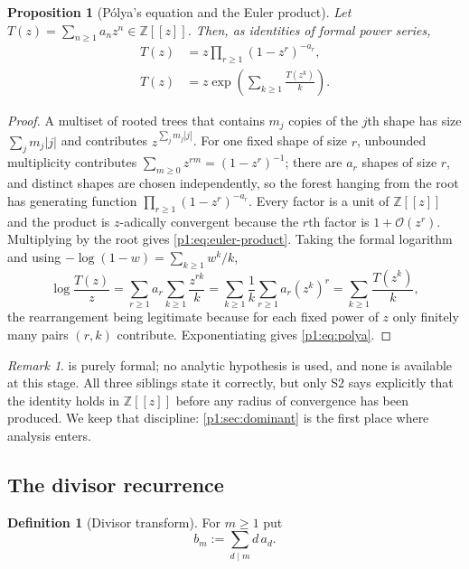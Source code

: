 \documentclass[11pt,a4paper,oneside]{book}
\theoremstyle{plain}
\newtheorem{proposition}[theorem]{Proposition}
\theoremstyle{definition}
\newtheorem{definition}[theorem]{Definition}
\theoremstyle{remark}
\newtheorem{remark}[theorem]{Remark}
\newcommand{\Int}{\mathbb{Z}}
\newcommand{\bigO}{\mathcal{O}}
\begin{document}
\begin{proposition}[P\'olya's equation and the Euler product]
\label{p1:prop:polya}
Let $T(z)=\sum_{n\ge1}a_nz^n\in\Int[[z]]$.  Then, as identities of formal power series,
\begin{align}
 T(z)&=z\prod_{r\ge1}(1-z^r)^{-a_r},
 \label{p1:eq:euler-product}\\
 T(z)&=z\exp\!\left(\sum_{k\ge1}\frac{T(z^k)}{k}\right).
 \label{p1:eq:polya}
\end{align}
\end{proposition}

\begin{proof}
A multiset of rooted trees that contains $m_j$ copies of the $j$th shape has size
$\sum_jm_j|j|$ and contributes $z^{\sum_jm_j|j|}$.  For one fixed shape of size $r$, unbounded
multiplicity contributes $\sum_{m\ge0}z^{rm}=(1-z^r)^{-1}$; there are $a_r$ shapes of size
$r$, and distinct shapes are chosen independently, so the forest hanging from the root has
generating function $\prod_{r\ge1}(1-z^r)^{-a_r}$.  Every factor is a unit of $\Int[[z]]$ and
the product is $z$-adically convergent because the $r$th factor is $1+\bigO(z^r)$. Multiplying
by the root gives \cref{p1:eq:euler-product}.  Taking the formal logarithm and using
$-\log(1-w)=\sum_{k\ge1}w^k/k$,
\[
\log\frac{T(z)}{z} =\sum_{r\ge1}a_r\sum_{k\ge1}\frac{z^{rk}}{k}
=\sum_{k\ge1}\frac1k\sum_{r\ge1}a_r(z^k)^r =\sum_{k\ge1}\frac{T(z^k)}{k},
\]
the rearrangement being legitimate because for each fixed power of $z$ only finitely many
pairs $(r,k)$ contribute.  Exponentiating gives \cref{p1:eq:polya}.
\end{proof}

\begin{remark}
 is purely formal; no analytic hypothesis is used, and none is available at
this stage.  All three siblings state it correctly, but only \textsf{S2} says explicitly that
the identity holds in $\Int[[z]]$ before any radius of convergence has been produced.  We keep
that discipline: \cref{p1:sec:dominant} is the first place where analysis enters.
\end{remark}

\subsection{The divisor recurrence}

\begin{definition}[Divisor transform]
\label{p1:def:divisor}
For $m\ge1$ put
\begin{equation}
 b_m:=\sum_{d\mid m}d\,a_d .
 \label{p1:eq:divisor}
\end{equation}
\end{definition}
\end{document}
